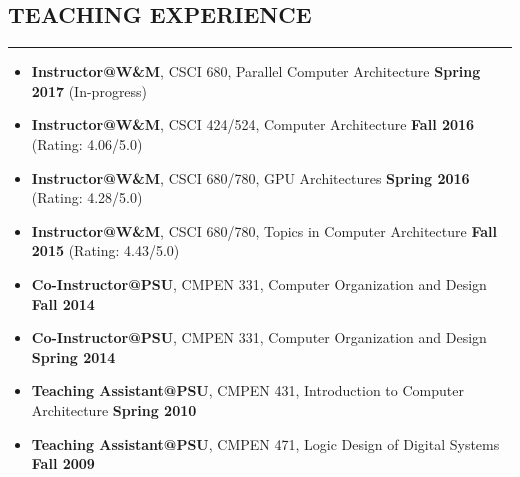 \documentclass[10pt,a4]{article}
\begin{document}
\subsection*{TEACHING EXPERIENCE}
\hrule
\vspace{0.2cm}
\begin{itemize}
\item{\bf Instructor@W\&M}, CSCI 680, Parallel Computer Architecture \hfill {\bf Spring 2017}  (In-progress)
\item{\bf Instructor@W\&M}, CSCI 424/524, Computer Architecture \hfill {\bf Fall 2016}  (Rating: 4.06/5.0)
\item{\bf Instructor@W\&M}, CSCI 680/780, GPU Architectures \hfill {\bf Spring 2016}  (Rating: 4.28/5.0)
\item{\bf Instructor@W\&M}, CSCI 680/780, Topics in Computer Architecture \hfill {\bf Fall 2015} (Rating: 4.43/5.0)
\item{\bf Co-Instructor@PSU}, CMPEN 331, Computer Organization and Design \hfill {\bf Fall 2014} 
\item{\bf Co-Instructor@PSU}, CMPEN 331, Computer Organization and Design \hfill {\bf Spring 2014} 
\item{\bf Teaching Assistant@PSU}, CMPEN 431, Introduction to Computer Architecture  \hfill {\bf Spring 2010} 
\item{\bf Teaching Assistant@PSU}, CMPEN 471, Logic Design of Digital Systems  \hfill {\bf Fall 2009} 
\end{itemize}
\end{document}
